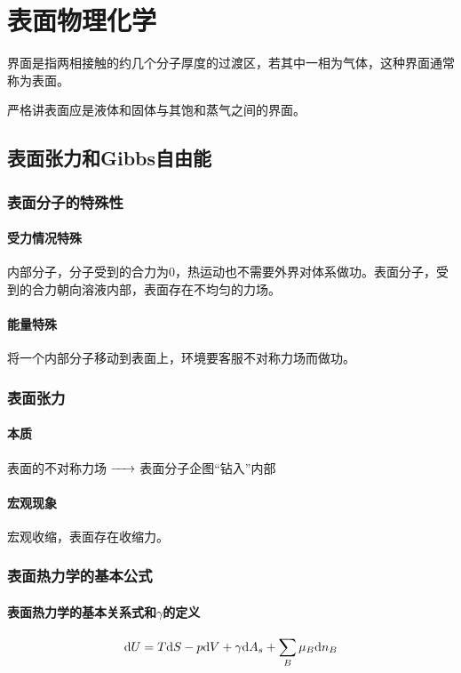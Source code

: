 \chapter{表面物理化学}

界面是指两相接触的约几个分子厚度的过渡区，若其中一相为气体，这种界面通常称为表面。

严格讲表面应是液体和固体与其饱和蒸气之间的界面。

\section{表面张力和Gibbs自由能}

\subsection{表面分子的特殊性}

\subsubsection{受力情况特殊}

内部分子，分子受到的合力为0，热运动也不需要外界对体系做功。表面分子，受到的合力朝向溶液内部，表面存在不均匀的力场。

\subsubsection{能量特殊}
将一个内部分子移动到表面上，环境要客服不对称力场而做功。
\subsection{表面张力}
\subsubsection{本质}
表面的不对称力场$\ce{->}$表面分子企图``钻入''内部
\subsubsection{宏观现象}
宏观收缩，表面存在收缩力。
\subsection{表面热力学的基本公式}
\subsubsection{表面热力学的基本关系式和$\gamma$的定义}
\begin{equation*}
    \mathrm{d} U = T \mathrm{d} S- p \mathrm{d} V+ \gamma\mathrm{d} A_s + \sum_B \mu_B \mathrm{d} n_B
\end{equation*}

